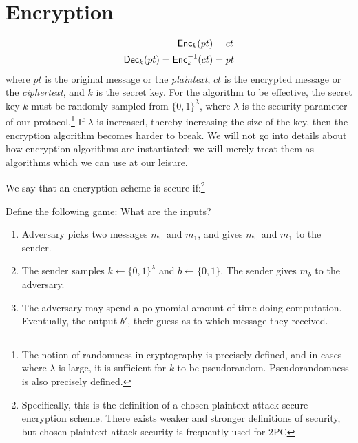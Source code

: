 \section{Encryption}
\begin{equation}
    \label{eqn:encryption}
    \begin{split}
        \textsf{Enc}_k (pt) & = ct  \\
        \textsf{Dec}_k(pt) = \textsf{Enc}^{-1}_k(ct) & = pt
    \end{split}
\end{equation}
where $pt$ is the original message or the \emph{plaintext}, $ct$ is the encrypted message or the \emph{ciphertext}, and $k$ is the secret key.
For the algorithm to be effective, the secret key $k$ must be randomly sampled from $\{0,1\}^\lambda$, where $\lambda$ is the security parameter of our protocol.\footnote{The notion of randomness in cryptography is precisely defined, and in cases where $\lambda$ is large, it is sufficient for $k$ to be pseudorandom. Pseudorandomness is also precisely defined.}
If  $\lambda$ is increased, thereby increasing the size of the key, then the encryption algorithm becomes harder to break.
We will not go into details about how encryption algorithms are instantiated; we will merely treat them as algorithms which we can use at our leisure.

\begin{definition}
We say that an encryption scheme is secure if:\footnote{Specifically, this is the definition of a chosen-plaintext-attack secure encryption scheme. There exists weaker and stronger definitions of security, but chosen-plaintext-attack security is frequently used for 2PC}

Define the following game:
What are the inputs?
\begin{enumerate}
\item Adversary picks two messages $m_0$ and $m_1$, and gives $m_0$ and $m_1$ to the sender. 
\item The sender samples $k \gets \{0,1\}^{\lambda}$ and $b \gets \{0,1\}$. The sender gives $m_b$ to the adversary. 
\item The adversary may spend a polynomial amount of time doing computation. Eventually, the output $b'$, their guess as to which message they received.
\end{enumerate}
\end{definition}


